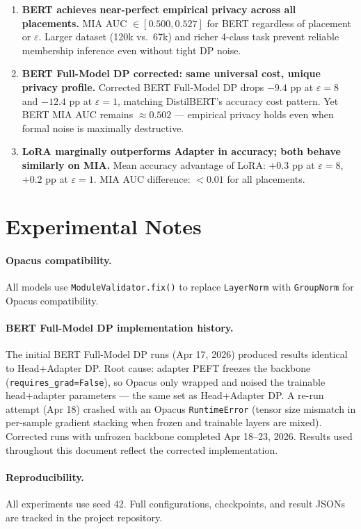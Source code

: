 \documentclass[11pt,letterpaper]{article}
\newcommand{\eps}{\varepsilon}
\begin{document}
\begin{enumerate}
  \item \textbf{BERT achieves near-perfect empirical privacy across all placements.}
    MIA AUC $\in [0.500, 0.527]$ for BERT regardless of placement or $\eps$.
    Larger dataset (120k vs.\ 67k) and richer 4-class task prevent
    reliable membership inference even without tight DP noise.

  \item \textbf{BERT Full-Model DP corrected: same universal cost, unique privacy profile.}
    Corrected BERT Full-Model DP drops $-9.4$ pp at $\eps=8$ and $-12.4$ pp at $\eps=1$,
    matching DistilBERT's accuracy cost pattern.
    Yet BERT MIA AUC remains $\approx 0.502$ --- empirical privacy holds
    even when formal noise is maximally destructive.

  \item \textbf{LoRA marginally outperforms Adapter in accuracy; both behave similarly on MIA.}
    Mean accuracy advantage of LoRA: $+0.3$ pp at $\eps=8$, $+0.2$ pp at $\eps=1$.
    MIA AUC difference: $< 0.01$ for all placements.

\end{enumerate}

\appendix
\section{Experimental Notes}

\paragraph{Opacus compatibility.}
All models use \texttt{ModuleValidator.fix()} to replace \texttt{LayerNorm} with
\texttt{GroupNorm} for Opacus compatibility.

\paragraph{BERT Full-Model DP implementation history.}
The initial BERT Full-Model DP runs (Apr 17, 2026) produced results identical to
Head+Adapter DP.
Root cause: adapter PEFT freezes the backbone (\texttt{requires\_grad=False}),
so Opacus only wrapped and noised the trainable head+adapter parameters ---
the same set as Head+Adapter DP.
A re-run attempt (Apr 18) crashed with an Opacus \texttt{RuntimeError} (tensor size
mismatch in per-sample gradient stacking when frozen and trainable layers are mixed).
Corrected runs with unfrozen backbone completed Apr 18--23, 2026.
Results used throughout this document reflect the corrected implementation.

\paragraph{Reproducibility.}
All experiments use seed 42.
Full configurations, checkpoints, and result JSONs are tracked in the project
repository.
\end{document}
